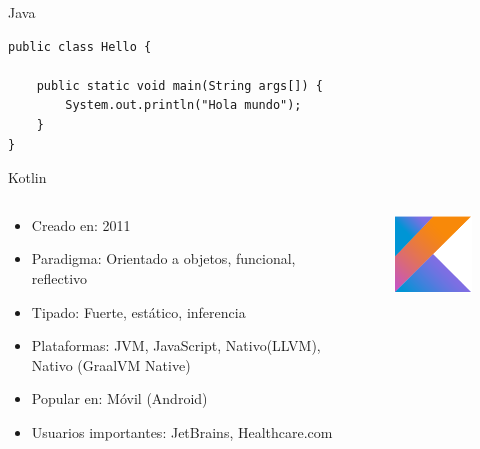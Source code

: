 \documentclass[aspectratio=169]{beamer}
\begin{document}
\begin{frame}[fragile]{Java}
\begin{lstlisting}
public class Hello {

    public static void main(String args[]) {
        System.out.println("Hola mundo");
    }
}
\end{lstlisting}
\end{frame}


\begin{frame}{Kotlin}
	\begin{columns}[T] %
		\begin{column}[T]{0.5\textwidth} %
			\begin{itemize}
				\item Creado en: 2011
				\item Paradigma: Orientado a objetos, funcional, reflectivo
				\item Tipado: Fuerte, estático, inferencia
				\item Plataformas: JVM, JavaScript, Nativo(LLVM), Nativo (GraalVM Native)
				\item Popular en: Móvil (Android)
				\item Usuarios importantes: JetBrains, Healthcare.com
			\end{itemize}
		\end{column}
		\begin{column}[T]{7cm} %
			\begin{figure}
				\centering
				\includegraphics[width=0.5\linewidth]{Images/kotlin}
			\end{figure}

		\end{column}
	\end{columns}
\end{frame}
\end{document}
